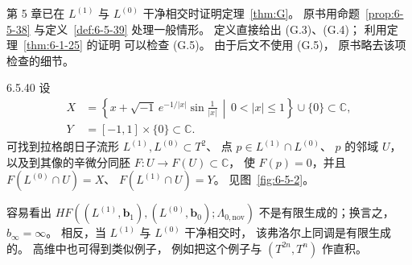 第 5 章已在 $L^{(1)}$ 与 $L^{(0)}$
干净相交时证明定理~\ref{thm:G}。
原书用命题~\ref{prop:6-5-38}
与定义~\ref{def:6-5-39}
处理一般情形。
定义直接给出 (G.3)、(G.4)；
利用定理~\ref{thm:6-1-25} 的证明
可以检查 (G.5)。
由于后文不使用 (G.5)，
原书略去该项检查的细节。

\begin{example}{6.5.40}\label{ex:6-5-40}
设
\[
\begin{aligned}
X&=
\left\{
x+\sqrt{-1}\,e^{-1/|x|}
\sin\frac1{|x|}
\,\middle|\,0<|x|\le1
\right\}\cup\{0\}
\subset\mathbb C,\\
Y&=[-1,1]\times\{0\}\subset\mathbb C.
\end{aligned}
\]
可找到拉格朗日子流形
$L^{(1)},L^{(0)}\subset T^2$、
点 $p\in L^{(1)}\cap L^{(0)}$、
$p$ 的邻域 $U$，
以及到其像的辛微分同胚
$F:U\to F(U)\subset\mathbb C$，
使 $F(p)=0$，并且
$F(L^{(0)}\cap U)=X$、
$F(L^{(1)}\cap U)=Y$。
见图~\ref{fig:6-5-2}。

容易看出
$HF((L^{(1)},\mathbf b_1),
(L^{(0)},\mathbf b_0);
\Lambda_{0,\mathrm{nov}})$
不是有限生成的；换言之，
$b_\infty=\infty$。
相反，当 $L^{(1)}$ 与 $L^{(0)}$
干净相交时，
该弗洛尔上同调是有限生成的。
高维中也可得到类似例子，
例如把这个例子与
$(T^{2n},T^n)$ 作直积。
\end{example}

